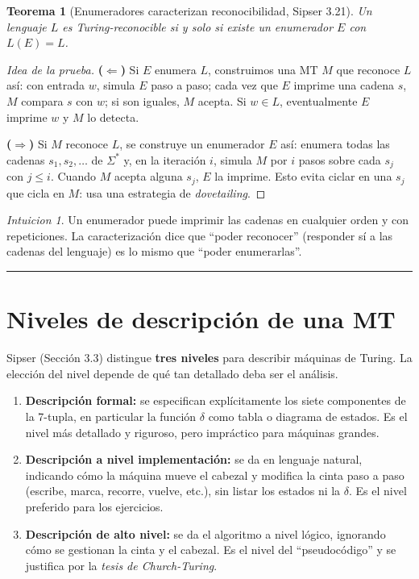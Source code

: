 \documentclass[11pt,a4paper]{article}
\theoremstyle{plain}
\newtheorem{teorema}{Teorema}[section]
\theoremstyle{definition}
\theoremstyle{remark}
\newtheorem*{intuicion}{Intuicion}
\newcommand{\Sstar}{\Sigma^{*}}
\begin{document}
\begin{teorema}[Enumeradores caracterizan reconocibilidad, Sipser 3.21]
\label{teo:enumerador}
Un lenguaje $L$ es Turing-reconocible si y solo si existe un enumerador $E$
con $L(E)=L$.
\end{teorema}

\begin{proof}[Idea de la prueba]
\textbf{($\Leftarrow$)} Si $E$ enumera $L$, construimos una MT $M$ que
reconoce $L$ as\'i: con entrada $w$, simula $E$ paso a paso; cada vez que
$E$ imprime una cadena $s$, $M$ compara $s$ con $w$; si son iguales, $M$
acepta. Si $w\in L$, eventualmente $E$ imprime $w$ y $M$ lo detecta.

\textbf{($\Rightarrow$)} Si $M$ reconoce $L$, se construye un enumerador
$E$ as\'i: enumera todas las cadenas $s_1,s_2,\dots$ de $\Sstar$ y, en la
iteraci\'on $i$, simula $M$ por $i$ pasos sobre cada $s_j$ con $j\le i$.
Cuando $M$ acepta alguna $s_j$, $E$ la imprime. Esto evita ciclar en una
$s_j$ que cicla en $M$: usa una estrategia de \emph{dovetailing}.
\end{proof}

\begin{intuicion}
Un enumerador puede imprimir las cadenas en cualquier orden y con
repeticiones. La caracterizaci\'on dice que ``poder reconocer'' (responder
s\'i a las cadenas del lenguaje) es lo mismo que ``poder enumerarlas''.
\end{intuicion}

\bigskip\hrule\bigskip

\section{Niveles de descripci\'on de una MT}
\label{sec:niveles}

Sipser (Secci\'on 3.3) distingue \textbf{tres niveles} para describir
m\'aquinas de Turing. La elecci\'on del nivel depende de qu\'e tan
detallado deba ser el an\'alisis.

\begin{enumerate}
  \item \textbf{Descripci\'on formal:} se especifican expl\'icitamente los
        siete componentes de la 7-tupla, en particular la funci\'on $\delta$
        como tabla o diagrama de estados. Es el nivel m\'as detallado y
        riguroso, pero impr\'actico para m\'aquinas grandes.
  \item \textbf{Descripci\'on a nivel implementaci\'on:} se da en lenguaje
        natural, indicando c\'omo la m\'aquina mueve el cabezal y modifica
        la cinta paso a paso (escribe, marca, recorre, vuelve, etc.), sin
        listar los estados ni la $\delta$. Es el nivel preferido para los
        ejercicios.
  \item \textbf{Descripci\'on de alto nivel:} se da el algoritmo a nivel
        l\'ogico, ignorando c\'omo se gestionan la cinta y el cabezal. Es
        el nivel del ``pseudoc\'odigo'' y se justifica por la
        \emph{tesis de Church-Turing}.
\end{enumerate}
\end{document}
